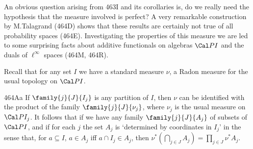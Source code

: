 
\def\chaptername{Pointwise compact sets of measurable functions}
\def\sectionname{Talagrand's measure}


An obvious question arising from 463I and its corollaries is, do we
really need the
hypothesis that the measure involved is perfect?   A very remarkable
construction by M.Talagrand (464D) shows that these results are
certainly not true of all probability spaces (464E).   Investigating the
properties of this measure we are led to some surprising facts about
additive functionals on algebras $\Cal PI$ and the duals of
$\ell^{\infty}$ spaces (464M, 464R).

 Recall that for any set $I$ we have a standard measure $\nu$, a
Radon measure for the usual topology on $\Cal PI$.   

\spheader 464Aa If $\family{j}{J}{I_j}$ is any partition of $I$, then
$\nu$ can be identified with the product of the family
$\family{j}{J}{\nu_j}$,
where $\nu_j$ is the usual measure on $\Cal PI_j$.   It
follows that if we have any family $\family{j}{J}{A_j}$ of subsets of
$\Cal PI$, and if for each $j$ the set $A_j$ is `determined by
coordinates in $I_j$' in the sense that, for $a\subseteq I$, $a\in A_j$
iff $a\cap I_j\in A_j$, then
$\nu^*(\bigcap_{j\in J}A_j)=\prod_{j\in J}\nu^*A_j$.

